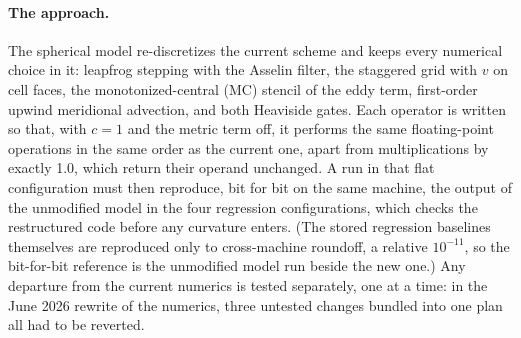 \documentclass[11pt]{article}
\begin{document}
\paragraph{The approach.} The spherical model re-discretizes the current scheme
and keeps every numerical choice in it: leapfrog stepping with the Asselin
filter, the staggered grid with $v$ on cell faces, the monotonized-central (MC)
stencil of the eddy term, first-order upwind meridional advection, and both
Heaviside gates. Each operator is written so that, with $c = 1$ and the metric
term off, it performs the same floating-point operations in the same order as
the current one, apart from multiplications by exactly 1.0, which return their
operand unchanged. A run in that flat configuration must then reproduce, bit
for bit on the same machine, the output of the unmodified model in the four
regression configurations, which checks the restructured code before any
curvature enters. (The stored regression baselines themselves are reproduced
only to cross-machine roundoff, a relative $10^{-11}$, so the bit-for-bit
reference is the unmodified model run beside the new one.) Any departure from the current numerics is
tested separately, one at a time: in the June 2026 rewrite of the numerics,
three untested changes bundled into one plan all had to be reverted.
\end{document}
